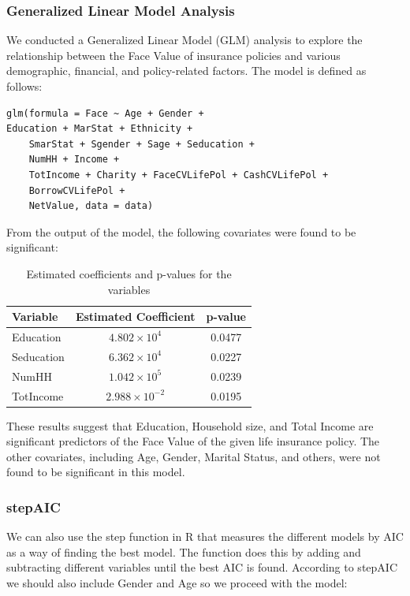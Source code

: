 \documentclass[12pt, twoside,hidelinks]{article}
\theoremstyle{definition}
\numberwithin{equation}{section}
\begin{document}
\subsubsection{Generalized Linear Model Analysis}
We conducted a Generalized Linear Model (GLM) analysis to explore the relationship between the Face Value of insurance policies and various demographic, financial, and policy-related factors. The model is defined as follows:

\begin{verbatim}
glm(formula = Face ~ Age + Gender +
Education + MarStat + Ethnicity + 
    SmarStat + Sgender + Sage + Seducation + 
    NumHH + Income + 
    TotIncome + Charity + FaceCVLifePol + CashCVLifePol + 
    BorrowCVLifePol + 
    NetValue, data = data)
\end{verbatim}

From the output of the model, the following covariates were found to be significant:


\begin{table}[h]
\centering
\begin{tabular}{lcc}
\hline
Variable   & Estimated Coefficient & p-value  \\ \hline
Education  & \(4.802 \times 10^4\) & 0.0477   \\
Seducation & \(6.362 \times 10^4\) & 0.0227   \\
NumHH      & \(1.042 \times 10^5\) & 0.0239   \\
TotIncome  & \(2.988 \times 10^{-2}\) & 0.0195 \\
\hline
\end{tabular}
\caption{Estimated coefficients and p-values for the variables}
\label{table:coefficients}
\end{table}

These results suggest that Education, Household size, and Total Income are significant predictors of the Face Value of the given life insurance policy. The other covariates, including Age, Gender, Marital Status, and others, were not found to be significant in this model. 

\subsubsection*{stepAIC}

We can also use the step function in R that measures the different models by AIC as a way of finding the best model. The function does this by adding and subtracting different variables until the best AIC is found. According to stepAIC we should also include Gender and Age so we proceed with the model:
\end{document}
